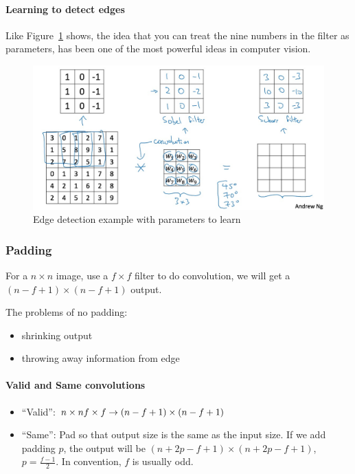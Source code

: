 \documentclass[UTF8]{article}
\begin{document}
\paragraph{Learning to detect edges}
Like Figure~\ref{fig:learning-to-detect-edges} shows, the idea that you can treat the nine numbers
in the filter as parameters, has been one of the most powerful ideas in computer vision.

\begin{figure}[htb]
    \centering
    \includegraphics[width=40em]{figures/learning-to-detect-edges}
    \caption{Edge detection example with parameters to learn}
    \label{fig:learning-to-detect-edges}
\end{figure}

\subsubsection{Padding}
For a $n \times n$ image, use a $f \times f$ filter to do convolution, we will get a $(n-f+1) \times
(n-f+1)$ output.

The problems of no padding:
\begin{itemize}
    \item shrinking output
    \item throwing away information from edge
\end{itemize}

\paragraph{Valid and Same convolutions}
\begin{itemize}
    \item ``Valid'': $n \times n \* f \times f \rightarrow (n-f+1) \times (n-f+1)$
    \item ``Same'': Pad so that output size is the same as the input size.
    If we add padding $p$, the output will be $(n+2p-f+1) \times (n+2p-f+1)$, $\displaystyle
    p = \frac{f-1}{2}$. In convention, $f$ is usually odd.
\end{itemize}
\end{document}
